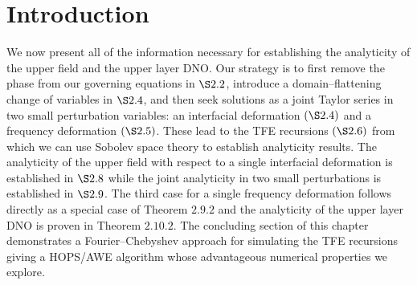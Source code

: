 \section{Introduction}
\label{intro:chapter 2 introduction}
We now present all of the information necessary for establishing the analyticity of the upper field and the upper layer DNO. Our strategy is to first remove the phase from our governing equations in $\S 2.2$, introduce a domain--flattening change of variables in $\S2.4$, and then seek solutions as a joint Taylor series in two small perturbation variables: an interfacial deformation $(\S2.4)$ and a frequency deformation $(\S2.5)$. These lead to the TFE recursions $(\S2.6)$ from which we can use Sobolev space theory to establish analyticity results. The analyticity of the upper field with respect to a single interfacial deformation is established in $\S2.8$ while the joint analyticity in two small perturbations is established in $\S2.9$. The third case for a single frequency deformation follows directly as a special case of Theorem $2.9.2$ and the analyticity of the upper layer DNO is proven in Theorem $2.10.2$. The concluding section of this chapter demonstrates a Fourier--Chebyshev approach for simulating the TFE recursions giving a HOPS/AWE algorithm whose advantageous numerical properties we explore.